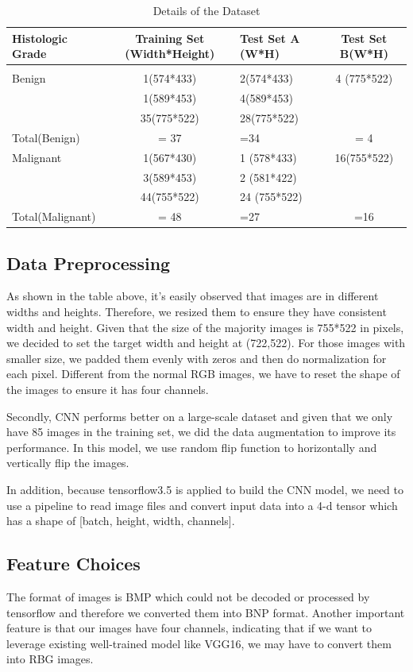 \documentclass[twoside,11pt]{article}
\begin{document}
\begin{table}[htbp]
  \centering 
  \begin{tabular}{lclc} 
    Histologic Grade & Training Set (Width*Height) & Test Set A (W*H)& Test Set B(W*H) \\ 
    \hline \\[-11pt]
    Benign & 1(574*433) & 2(574*433) & 4 (775*522) \\ 
           & 1(589*453) & 4(589*453) & \\
           &35(775*522) &28(775*522) & \\
    Total(Benign) & = 37       & =34        & = 4 \\ \hline
    Malignant & 1(567*430) & 1 (578*433) & 16(755*522) \\
              & 3(589*453) & 2 (581*422) & \\
              & 44(755*522) & 24 (755*522) & \\
    Total(Malignant) & = 48 & =27 & =16\\ \hline 
  \end{tabular}
  \label{tab:example} 
    \caption{Details of the Dataset} 
\end{table}

\subsection{Data Preprocessing} 
As shown in the table above, it's easily observed that images are in different widths and heights. Therefore, we resized them to ensure they have consistent width and height. Given that the size of the majority images is 755*522 in pixels, we decided to set the target width and height at (722,522). For those images with smaller size, we padded them evenly with zeros and then do normalization for each pixel. Different from the normal RGB images, we have to reset the shape of the images to ensure it has four channels. 

Secondly, CNN performs better on a large-scale dataset and given that we only have 85 images in the training set, we did the data augmentation to improve its performance. In this model, we use random flip function to horizontally and vertically flip the images. 

In addition, because tensorflow3.5 is applied to build the CNN model, we need to use a pipeline to read image files and convert input data into a 4-d tensor which has a shape of [batch, height, width, channels].

\subsection{Feature Choices} 
The format of images is BMP which could not be decoded or processed by tensorflow and therefore we converted them into BNP format. Another important feature is that our images have four channels, indicating that if we want to leverage existing well-trained model like VGG16, we may have to convert them into RBG images. 
\end{document}
